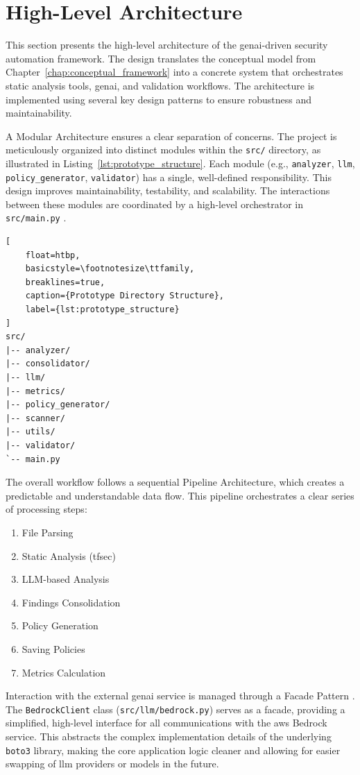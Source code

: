 \section{High-Level Architecture}

This section presents the high-level architecture of the \gls{genai}-driven security automation framework. The design translates the conceptual model from Chapter~\ref{chap:conceptual_framework} into a concrete system that orchestrates static analysis tools, \gls{genai}, and validation workflows. The architecture is implemented using several key design patterns to ensure robustness and maintainability.

A Modular Architecture ensures a clear separation of concerns. The project is meticulously organized into distinct modules within the \texttt{src/} directory, as illustrated in Listing~\ref{lst:prototype_structure}. Each module (e.g., \texttt{analyzer}, \texttt{llm}, \texttt{policy\_generator}, \texttt{validator}) has a single, well-defined responsibility. This design improves maintainability, testability, and scalability. The interactions between these modules are coordinated by a high-level orchestrator in \texttt{src/main.py} \cite{martin_clean_2009}.

\begin{lstlisting}[
    float=htbp,
    basicstyle=\footnotesize\ttfamily, 
    breaklines=true,
    caption={Prototype Directory Structure},
    label={lst:prototype_structure}
]
src/
|-- analyzer/
|-- consolidator/
|-- llm/
|-- metrics/
|-- policy_generator/
|-- scanner/
|-- utils/
|-- validator/
`-- main.py
\end{lstlisting}

The overall workflow follows a sequential Pipeline Architecture, which creates a predictable and understandable data flow. This pipeline orchestrates a clear series of processing steps:
\begin{enumerate}
\item File Parsing
\item Static Analysis (tfsec)
\item LLM-based Analysis
\item Findings Consolidation
\item Policy Generation
\item Saving Policies
\item Metrics Calculation
\end{enumerate}

Interaction with the external \gls{genai} service is managed through a Facade Pattern \cite{gamma_design_2011}. The \texttt{BedrockClient} class (\texttt{src/llm/bedrock.py}) serves as a facade, providing a simplified, high-level interface for all communications with the \gls{aws} Bedrock service. This abstracts the complex implementation details of the underlying \texttt{boto3} library, making the core application logic cleaner and allowing for easier swapping of \gls{llm} providers or models in the future.


